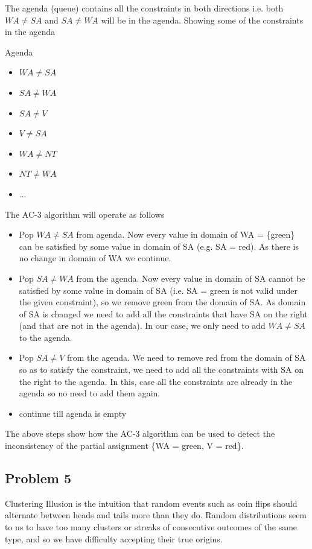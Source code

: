 \documentclass[12pt,a4paper]{article}
\begin{document}
The agenda (queue) contains all the constraints in both directions i.e. both $WA \neq SA$ and $SA \neq WA$ will be in the agenda. Showing some of the constraints in the agenda

Agenda
\begin{itemize}
    \item $WA \neq SA$
    \item $SA \neq WA$
    \item $SA \neq V$
    \item $V \neq SA$
    \item $WA \neq NT$
    \item $NT \neq WA$
    \item ...
\end{itemize}

The AC-3 algorithm will operate as follows
\begin{itemize}
    \item Pop $WA \neq SA$ from agenda. Now every value in domain of WA = \{green\} can be satisfied by some value in domain of SA (e.g. SA = red). As there is no change in domain of WA we continue.
    \item Pop $SA \neq WA$ from the agenda. Now every value in domain of SA cannot be satisfied by some value in domain of SA (i.e. SA = green is not valid under the given constraint), so we remove green from the domain of SA. As domain of SA is changed we need to add all the constraints that have SA on the right (and that are not in the agenda). In our case, we only need to add $WA \neq SA$ to the agenda.
    \item Pop $SA \neq V$ from the agenda. We need to remove red from the domain of SA so as to satisfy the constraint, we need to add all the constraints with SA on the right to the agenda. In this, case all the constraints are already in the agenda so no need to add them again.
    \item continue till agenda is empty
\end{itemize}

The above steps show how the AC-3 algorithm can be used to detect the inconsistency of the partial assignment \{WA = green, V = red\}.

\subsection*{Problem 5}

Clustering Illusion is the intuition that random events such as coin flips should alternate between heads and tails more than they do. Random distributions seem to us to have too many clusters or streaks of consecutive outcomes of the same type, and so we have difficulty accepting their true origins.
\end{document}
